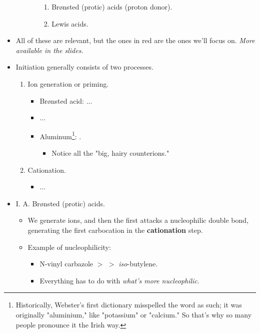 \documentclass[../notes.tex]{subfiles}
\begin{document}
\begin{itemize}
\begin{enumerate}
\begin{enumerate}
\begin{enumerate}
                \item Br\o nsted (protic) acids (proton donor).
                \item Lewis acids.
            \end{enumerate}
        \end{enumerate}
    \end{enumerate}
    \item All of these are relevant, but the ones in red are the ones we'll focus on. \emph{More available in the slides.}
    \item Initiation generally consists of two processes.
    \begin{enumerate}
        \item Ion generation or priming.
        \begin{itemize}
            \item Br\o nsted acid: ...
            \item ...
            \item Aluminum\footnote{Historically, Webster's first dictionary misspelled the word as such; it was originally "aluminium," like "potassium" or "calcium." So that's why so many people pronounce it the Irish way.}: .
            \begin{itemize}
                \item Notice all the "big, hairy counterions."
            \end{itemize}
        \end{itemize}
        \item Cationation.
        \begin{itemize}
            \item ...
        \end{itemize}
    \end{enumerate}
    \item I. A. Br\o nsted (protic) acids.
    \begin{itemize}
        \item We generate  ions, and then the first  attacks a nucleophilic double bond, generating the first carbocation in the \textbf{cationation} step.
        \item Example of nucleophilicity:
        \begin{itemize}
            \item N-vinyl carbazole $>$  $>$ \emph{iso}-butylene.
            \item Everything has to do with \emph{what's more nucleophilic}.

\end{itemize}
\end{itemize}
\end{itemize}
\end{document}
